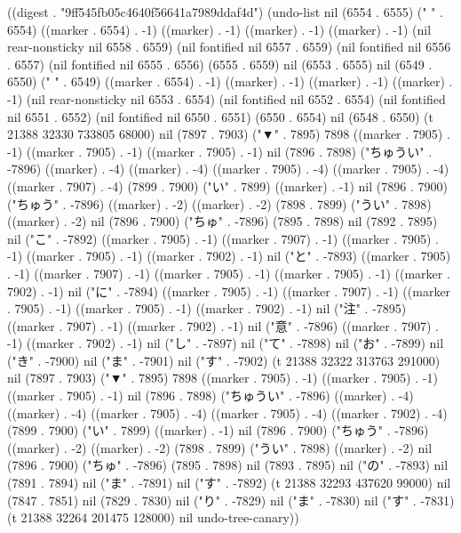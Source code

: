 
((digest . "9ff545fb05c4640f56641a7989ddaf4d") (undo-list nil (6554 . 6555) ("  " . 6554) ((marker . 6554) . -1) ((marker) . -1) ((marker) . -1) ((marker) . -1) (nil rear-nonsticky nil 6558 . 6559) (nil fontified nil 6557 . 6559) (nil fontified nil 6556 . 6557) (nil fontified nil 6555 . 6556) (6555 . 6559) nil (6553 . 6555) nil (6549 . 6550) ("  " . 6549) ((marker . 6554) . -1) ((marker) . -1) ((marker) . -1) ((marker) . -1) (nil rear-nonsticky nil 6553 . 6554) (nil fontified nil 6552 . 6554) (nil fontified nil 6551 . 6552) (nil fontified nil 6550 . 6551) (6550 . 6554) nil (6548 . 6550) (t 21388 32330 733805 68000) nil (7897 . 7903) ("▼" . 7895) 7898 ((marker . 7905) . -1) ((marker . 7905) . -1) ((marker . 7905) . -1) nil (7896 . 7898) ("ちゅうい" . -7896) ((marker) . -4) ((marker) . -4) ((marker . 7905) . -4) ((marker . 7905) . -4) ((marker . 7907) . -4) (7899 . 7900) ("い" . 7899) ((marker) . -1) nil (7896 . 7900) ("ちゅう" . -7896) ((marker) . -2) ((marker) . -2) (7898 . 7899) ("うい" . 7898) ((marker) . -2) nil (7896 . 7900) ("ちゅ" . -7896) (7895 . 7898) nil (7892 . 7895) nil ("こ" . -7892) ((marker . 7905) . -1) ((marker . 7907) . -1) ((marker . 7905) . -1) ((marker . 7905) . -1) ((marker . 7902) . -1) nil ("と" . -7893) ((marker . 7905) . -1) ((marker . 7907) . -1) ((marker . 7905) . -1) ((marker . 7905) . -1) ((marker . 7902) . -1) nil ("に" . -7894) ((marker . 7905) . -1) ((marker . 7907) . -1) ((marker . 7905) . -1) ((marker . 7905) . -1) ((marker . 7902) . -1) nil ("注" . -7895) ((marker . 7907) . -1) ((marker . 7902) . -1) nil ("意" . -7896) ((marker . 7907) . -1) ((marker . 7902) . -1) nil ("し" . -7897) nil ("て" . -7898) nil ("お" . -7899) nil ("き" . -7900) nil ("ま" . -7901) nil ("す" . -7902) (t 21388 32322 313763 291000) nil (7897 . 7903) ("▼" . 7895) 7898 ((marker . 7905) . -1) ((marker . 7905) . -1) ((marker . 7905) . -1) nil (7896 . 7898) ("ちゅうい" . -7896) ((marker) . -4) ((marker) . -4) ((marker . 7905) . -4) ((marker . 7905) . -4) ((marker . 7902) . -4) (7899 . 7900) ("い" . 7899) ((marker) . -1) nil (7896 . 7900) ("ちゅう" . -7896) ((marker) . -2) ((marker) . -2) (7898 . 7899) ("うい" . 7898) ((marker) . -2) nil (7896 . 7900) ("ちゅ" . -7896) (7895 . 7898) nil (7893 . 7895) nil ("の" . -7893) nil (7891 . 7894) nil ("ま" . -7891) nil ("す" . -7892) (t 21388 32293 437620 99000) nil (7847 . 7851) nil (7829 . 7830) nil ("り" . -7829) nil ("ま" . -7830) nil ("す" . -7831) (t 21388 32264 201475 128000) nil undo-tree-canary))
